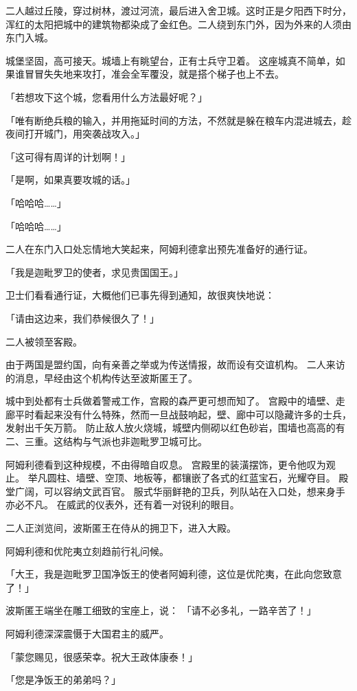 \documentclass[twoside,openany]{book}
\begin{document}
二人越过丘陵，穿过树林，渡过河流，最后进入舍卫城。这时正是夕阳西下时分，浑红的太阳把城中的建筑物都染成了金红色。二人绕到东门外，因为外来的人须由东门入城。

城堡坚固，高可接天。城墙上有眺望台，正有士兵守卫着。
这座城真不简单，如果谁冒冒失失地来攻打，准会全军覆没，就是搭个梯子也上不去。

「若想攻下这个城，您看用什么方法最好呢？」

「唯有断绝兵粮的输入，并用拖延时间的方法，不然就是躲在粮车内混进城去，趁夜间打开城门，用突袭战攻入。」

「这可得有周详的计划啊！」

「是啊，如果真要攻城的话。」

「哈哈哈……」

「哈哈哈……」

二人在东门入口处忘情地大笑起来，阿姆利德拿出预先准备好的通行证。

「我是迦毗罗卫的使者，求见贵国国王。」

卫士们看看通行证，大概他们已事先得到通知，故很爽快地说：

「请由这边来，我们恭候很久了！」

二人被领至客殿。

由于两国是盟约国，向有亲善之举或为传送情报，故而设有交谊机构。
二人来访的消息，早经由这个机构传达至波斯匿王了。

城中到处都有士兵做着警戒工作，宫殿的森严更可想而知了。
宫殿中的墙壁、走廊平时看起来没有什么特殊，然而一旦战鼓响起，壁、廊中可以隐藏许多的士兵，发射出千矢万箭。
防止敌人放火烧城，城壁内侧砌以红色砂岩，围墙也高高的有二、三重。这结构与气派也非迦毗罗卫城可比。

阿姆利德看到这种规模，不由得暗自叹息。
宫殿里的装潢摆饰，更令他叹为观止。
举凡圆柱、墙壁、空顶、地板等，都镶嵌了各式的红蓝宝石，光耀夺目。
殿堂广阔，可以容纳文武百官。
服式华丽鲜艳的卫兵，列队站在入口处，想来身手亦必不凡。
在威武的仪表外，还有着一对锐利的眼目。

二人正浏览间，波斯匿王在侍从的拥卫下，进入大殿。

阿姆利德和优陀夷立刻趋前行礼问候。

「大王，我是迦毗罗卫国净饭王的使者阿姆利德，这位是优陀夷，在此向您致意了！」

波斯匿王端坐在雕工细致的宝座上，说：
「请不必多礼，一路辛苦了！」

阿姆利德深深震慑于大国君主的威严。

「蒙您赐见，很感荣幸。祝大王政体康泰！」

「您是净饭王的弟弟吗？」
\end{document}
